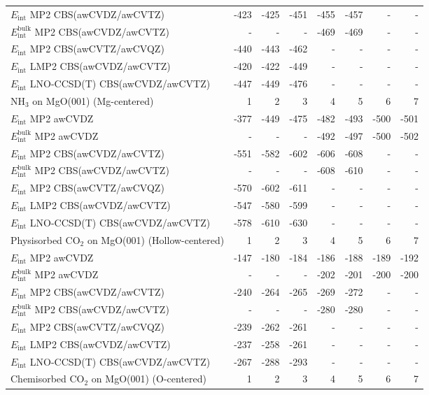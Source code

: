 \begin{longtable}{lrrrrrrr}
$E_\text{int}$ MP2 CBS(awCVDZ/awCVTZ) & -423 & -425 & -451 & -455 & -457 & - & - \\
$E_\text{int}^\text{bulk}$ MP2 CBS(awCVDZ/awCVTZ) & - & - & - & -469 & -469 & - & - \\
$E_\text{int}$ MP2 CBS(awCVTZ/awCVQZ) & -440 & -443 & -462 & - & - & - & - \\
$E_\text{int}$ LMP2 CBS(awCVDZ/awCVTZ) & -420 & -422 & -449 & - & - & - & - \\
$E_\text{int}$ LNO-CCSD(T) CBS(awCVDZ/awCVTZ) & -447 & -449 & -476 & - & - & - & - \\
\toprule
NH$_3$ on MgO(001) (Mg-centered) & 1 & 2 & 3 & 4 & 5 & 6 & 7 \\ 
\midrule
$E_\text{int}$ MP2 awCVDZ & -377 & -449 & -475 & -482 & -493 & -500 & -501 \\
$E_\text{int}^\text{bulk}$ MP2 awCVDZ & - & - & - & -492 & -497 & -500 & -502 \\
$E_\text{int}$ MP2 CBS(awCVDZ/awCVTZ) & -551 & -582 & -602 & -606 & -608 & - & - \\
$E_\text{int}^\text{bulk}$ MP2 CBS(awCVDZ/awCVTZ) & - & - & - & -608 & -610 & - & - \\
$E_\text{int}$ MP2 CBS(awCVTZ/awCVQZ) & -570 & -602 & -611 & - & - & - & - \\
$E_\text{int}$ LMP2 CBS(awCVDZ/awCVTZ) & -547 & -580 & -599 & - & - & - & - \\
$E_\text{int}$ LNO-CCSD(T) CBS(awCVDZ/awCVTZ) & -578 & -610 & -630 & - & - & - & - \\
\toprule
Physisorbed CO$_2$ on MgO(001) (Hollow-centered) & 1 & 2 & 3 & 4 & 5 & 6 & 7 \\ 
\midrule
$E_\text{int}$ MP2 awCVDZ & -147 & -180 & -184 & -186 & -188 & -189 & -192 \\
$E_\text{int}^\text{bulk}$ MP2 awCVDZ & - & - & - & -202 & -201 & -200 & -200 \\
$E_\text{int}$ MP2 CBS(awCVDZ/awCVTZ) & -240 & -264 & -265 & -269 & -272 & - & - \\
$E_\text{int}^\text{bulk}$ MP2 CBS(awCVDZ/awCVTZ) & - & - & - & -280 & -280 & - & - \\
$E_\text{int}$ MP2 CBS(awCVTZ/awCVQZ) & -239 & -262 & -261 & - & - & - & - \\
$E_\text{int}$ LMP2 CBS(awCVDZ/awCVTZ) & -237 & -258 & -261 & - & - & - & - \\
$E_\text{int}$ LNO-CCSD(T) CBS(awCVDZ/awCVTZ) & -267 & -288 & -293 & - & - & - & - \\
\toprule
Chemisorbed CO$_2$ on MgO(001) (O-centered) & 1 & 2 & 3 & 4 & 5 & 6 & 7 \\ 

\end{longtable}
